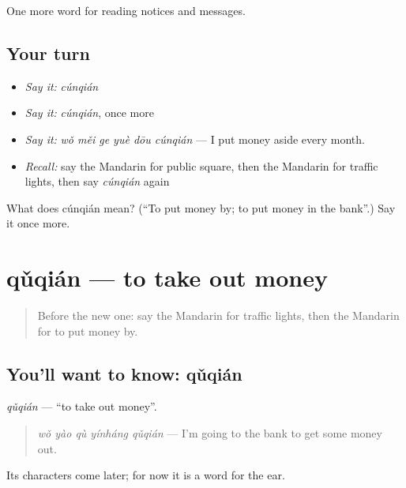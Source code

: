 \begin{grammarlens}[title={What you've built}]
One more word for reading notices and messages.
\end{grammarlens}

\subsection*{Your turn}
\begin{itemize}
\raggedright
  \item \emph{Say it:} \emph{cúnqián}
  \item \emph{Say it:} \emph{cúnqián}, once more
  \item \emph{Say it:} \emph{wǒ měi ge yuè dōu cúnqián} — I put money aside every month.
  \item \emph{Recall:} say the Mandarin for public square, then the Mandarin for traffic lights, then say \emph{cúnqián} again
\end{itemize}

\begin{tcolorbox}[breakable,colback=teal!4,colframe=teal!35!black,title={Before you move on}]
What does cúnqián mean? (\textquotedblleft{}To put money by; to put money in the bank\textquotedblright{}.) Say it once more.
\end{tcolorbox}
\section[qǔqián]{qǔqián — to take out money}

\label{lesson:ZH-C195-quqian}



\begin{quote}
Before the new one: say the Mandarin for traffic lights, then the Mandarin for to put money by.
\end{quote}

\subsection*{You'll want to know: qǔqián}
\emph{qǔqián} — \textquotedblleft{}to take out money\textquotedblright{}.

\begin{quote}
\emph{wǒ yào qù yínháng qǔqián} — I'm going to the bank to get some money out.
\end{quote}

Its characters come later; for now it is a word for the ear.

